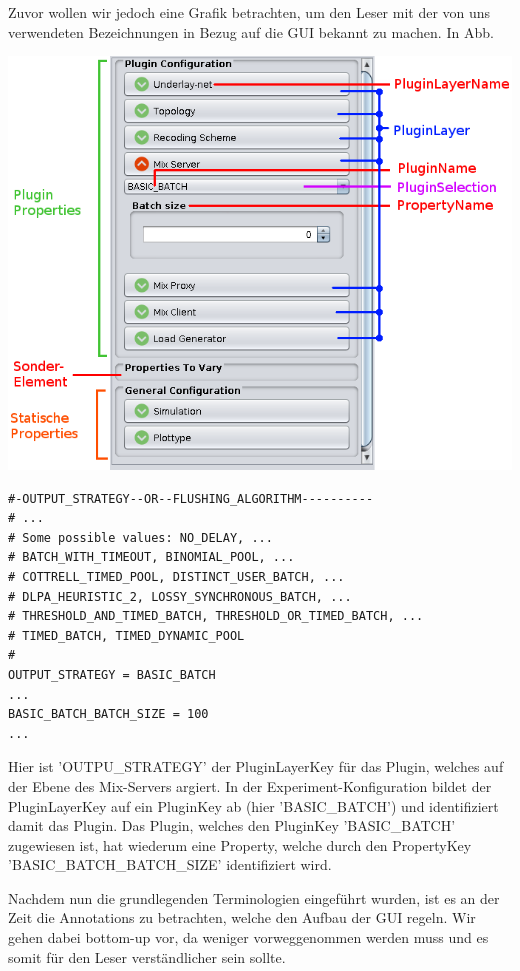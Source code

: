 \documentclass[a4paper, 11pt]{article} %
\begin{document}
Zuvor wollen wir jedoch eine Grafik betrachten, um den Leser mit der von uns verwendeten Bezeichnungen in Bezug auf die GUI bekannt zu machen. In Abb. 

\includegraphics[scale=0.56]{img/configtool_edit.png}

\begin{lstlisting}
#-OUTPUT_STRATEGY--OR--FLUSHING_ALGORITHM----------
# ...
# Some possible values: NO_DELAY, ... 
# BATCH_WITH_TIMEOUT, BINOMIAL_POOL, ... 
# COTTRELL_TIMED_POOL, DISTINCT_USER_BATCH, ... 
# DLPA_HEURISTIC_2, LOSSY_SYNCHRONOUS_BATCH, ...
# THRESHOLD_AND_TIMED_BATCH, THRESHOLD_OR_TIMED_BATCH, ... 
# TIMED_BATCH, TIMED_DYNAMIC_POOL
#	
OUTPUT_STRATEGY = BASIC_BATCH
...
BASIC_BATCH_BATCH_SIZE = 100
...
\end{lstlisting}

Hier ist 'OUTPU\_STRATEGY' der PluginLayerKey für das Plugin, welches auf der Ebene des Mix-Servers argiert. In der Experiment-Konfiguration bildet der PluginLayerKey auf ein PluginKey ab (hier 'BASIC\_BATCH') und identifiziert damit das Plugin. Das Plugin, welches den PluginKey 'BASIC\_BATCH' zugewiesen ist, hat wiederum eine Property, welche durch den PropertyKey 'BASIC\_BATCH\_BATCH\_SIZE' identifiziert wird.

Nachdem nun die grundlegenden Terminologien eingeführt wurden, ist es an der Zeit die Annotations zu betrachten, welche den Aufbau der GUI regeln. Wir gehen dabei bottom-up vor, da weniger vorweggenommen werden muss und es somit für den Leser verständlicher sein sollte.
\end{document}
